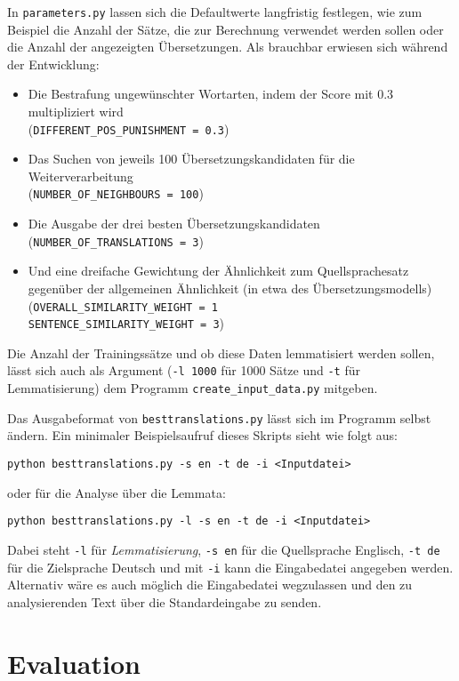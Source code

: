 \documentclass[11pt,twoside,openright]{mpreport}
\begin{document}
In \verb+parameters.py+ lassen sich die Defaultwerte langfristig festlegen, wie zum Beispiel die Anzahl der Sätze, die zur Berechnung verwendet werden sollen oder die Anzahl der angezeigten Übersetzungen. Als brauchbar erwiesen sich während der Entwicklung:
\begin{itemize}
\item Die Bestrafung ungewünschter Wortarten, indem der Score mit 0.3 multipliziert wird\\
(\verb+DIFFERENT_POS_PUNISHMENT = 0.3+)
\item Das Suchen von jeweils 100 Übersetzungskandidaten für die Weiterverarbeitung\\
(\verb+NUMBER_OF_NEIGHBOURS = 100+)
\item Die Ausgabe der drei besten Übersetzungskandidaten\\
(\verb+NUMBER_OF_TRANSLATIONS = 3+)
\item Und eine dreifache Gewichtung der Ähnlichkeit zum Quellsprachesatz gegenüber der allgemeinen Ähnlichkeit (in etwa des Übersetzungsmodells)\\
(\verb+OVERALL_SIMILARITY_WEIGHT = 1+\\
\verb+SENTENCE_SIMILARITY_WEIGHT = 3+)
\end{itemize}

Die Anzahl der Trainingssätze und ob diese Daten lemmatisiert werden sollen, lässt sich auch als Argument (\verb+-l 1000+ für 1000 Sätze und \verb+-t+ für Lemmatisierung) dem Programm \verb+create_input_data.py+ mitgeben.

Das Ausgabeformat von \verb+besttranslations.py+ lässt sich im Programm selbst ändern. Ein minimaler Beispielsaufruf dieses Skripts sieht wie folgt aus:

\verb+python besttranslations.py -s en -t de -i <Inputdatei>+

oder für die Analyse über die Lemmata:

\verb+python besttranslations.py -l -s en -t de -i <Inputdatei>+

Dabei steht \verb+-l+ für \emph{Lemmatisierung}, \verb+-s en+ für die Quellsprache Englisch, \verb+-t de+ für die Zielsprache Deutsch und mit \verb+-i+ kann die Eingabedatei angegeben werden. Alternativ wäre es auch möglich die Eingabedatei wegzulassen und den zu analysierenden Text über die Standardeingabe zu senden.
\chapter{Evaluation}
\label{cha:evaluation}
\end{document}
